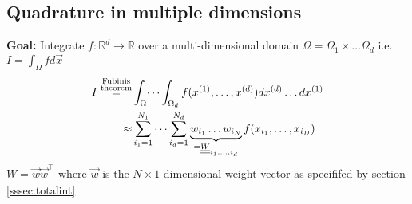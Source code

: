 \subsection{Quadrature in multiple dimensions}
    \textbf{Goal:} Integrate $f:\mathbb{R}^d\to\mathbb{R}$ over a multi-dimensional domain $\Omega = \Omega_1\times\dots\Omega_d$ i.e. $ I = \int_\Omega fd\vec{x}$
    \begin{align*}
         I \overset{\substack{\textnormal{Fubinis}\\\textnormal{theorem}}}{=}&\int_{\Omega}\dots\int_{\Omega_d}f(x^{(1)},\dots,x^{(d)})dx^{(d)}\dots dx^{(1)}\\
         \approx &\sum_{i_1=1}^{N_1}\dots\sum_{i_d=1}^{N_d} \underbrace{w_{i_1}\dots w_{i_N}}_{= \underline{\underline{W}}_{i_1,\dots,i_d}} f(x_{i_1},\dots, x_{i_D})
    \end{align*}
    $\underline{\underline{W}} = \Vec{w}\Vec{w}^\top$ where $\Vec{w}$ is the $N\times 1$ dimensional weight vector as specififed by section \ref{sssec:totalint}
    